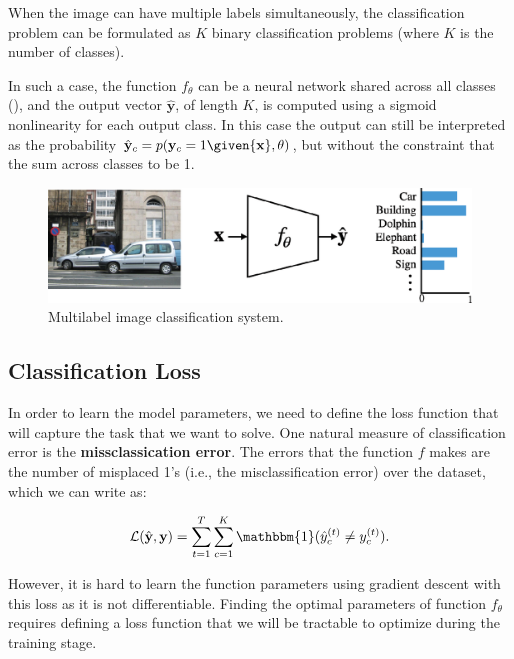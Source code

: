 When the image can have multiple labels simultaneously, the classification problem can be formulated as $K$ binary classification problems (where $K$ is the number of classes). 

In such a case, the function $f_\theta$ can be a neural network shared across all classes (\fig{\ref{fig:class_architecture}}), and the output vector $\hat{\mathbf{y}}$, of length $K$, is computed using a sigmoid nonlinearity for each output class. In this case the output can still be interpreted as the probability $\hat {\bf y}_c = p({\bf y}_c=1 \given {\bf x}, \theta)$, but without the constraint that the sum across classes to be 1. 


\begin{figure}
\centerline{
\includegraphics[width=0.7\linewidth]{figures/object_recognition/class_architecture.eps}}
\caption{Multilabel image classification system.}
\label{fig:class_architecture}
\end{figure}

\subsection{Classification Loss}

In order to learn the model parameters, we need to define the loss function that will capture the task that we want to solve. One natural measure of classification error is the {\bf missclassication error}. The errors that the function $f$ makes are the number of misplaced 1's (i.e., the  misclassification error) over the dataset, which we can write as:

\begin{align}
    \mathcal{L}(\hat{\mathbf{y}},\mathbf{y}) =
    \sum_{t=1}^T \sum_{c=1}^{K}
    \mathbbm{1}(\hat{y}^{(t)}_c \neq y^{(t)}_c ).
\end{align}

However, it is hard to learn the function parameters using gradient descent with this loss as it is not differentiable. Finding the optimal parameters of function $f_\theta$ requires defining a loss function that we will be tractable to optimize during the training stage. 


